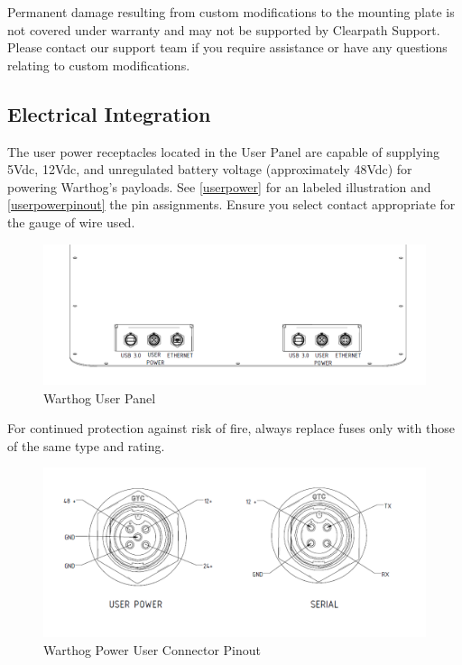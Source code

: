 \documentclass[]{clearpath-latex/clearpath-manual}
\begin{document}
\begin{warning}[]
Permanent damage resulting from custom modifications to the mounting plate is not covered under warranty and may not be supported by Clearpath Support.  Please contact our support team if you require assistance or have any questions relating to custom modifications.
\end{warning}


\pagebreak[4]
\subsection{Electrical Integration}
\label{electrical}

The user power receptacles located in the User Panel are capable of supplying 5Vdc, 12Vdc, and unregulated battery voltage (approximately 48Vdc) for powering Warthog's payloads. See \autoref{userpower} for an labeled illustration and \autoref{userpowerpinout} the pin assignments. Ensure you select contact appropriate for the gauge of wire used. 





\begin{figure}[!h]
  \centering
  \includegraphics[width=1.0\linewidth]{User_Panel_Labeled.PNG}
  \caption{Warthog User Panel}
  \label{userpower}
\end{figure}


\begin{warning}
For continued protection against risk of fire, always replace fuses only with those of the same type and rating.
\end{warning}


\begin{figure}[!htb]
  \centering
  \includegraphics[width=1.0\linewidth]{Breakout_pinouts.PNG}
  \caption{Warthog Power User Connector Pinout}
  \label{userpowerpinout}
\end{figure}
\end{document}

